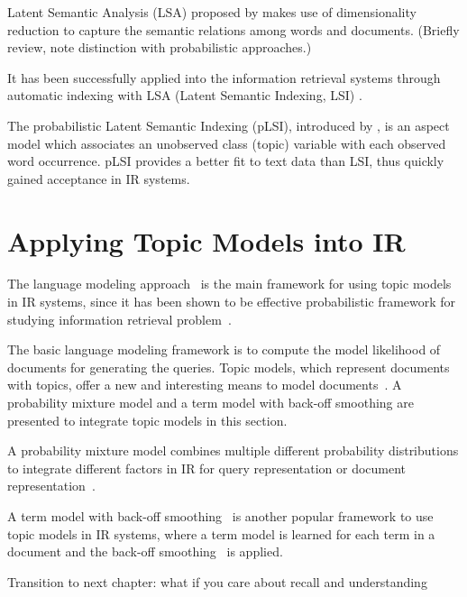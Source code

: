Latent Semantic Analysis (LSA) proposed by \citet{deerwester-90} makes use of dimensionality reduction to capture the semantic relations among words and documents.  (Briefly review, note distinction with probabilistic approaches.)

It has been successfully applied into the information retrieval systems through automatic indexing with LSA (Latent Semantic Indexing, LSI) \citep{deerwester-90,dumais-95}.

The probabilistic Latent Semantic Indexing (pLSI), introduced by \citet{hofmann-99a}, is an aspect model which associates an unobserved class (topic) variable with each observed word occurrence. pLSI provides a better fit to text data than LSI, thus quickly gained acceptance in IR systems.

\section{Applying Topic Models into IR}

The language modeling approach~\citep{croft-03,PonteCroft,song-99} is the main framework for using topic models in IR systems, since it has been shown to be effective probabilistic framework for studying information retrieval problem~\citep{PonteCroft,berger-99}.

The basic language modeling framework is to compute the model likelihood of documents for generating the queries. Topic models, which represent documents with topics, offer a new and interesting means to model documents~\citep{wei-07}. A probability mixture model and a term model with back-off smoothing are presented to integrate topic models in this section.

A probability mixture model combines multiple different probability distributions to integrate different factors in IR for query representation or document representation~\citep{miller-99,zhai-01,liu-04}.

A term model with back-off smoothing~\citep{katz-87} is another popular framework to use topic models in IR systems, where a term model is learned for each term in a document and the back-off smoothing~\citep{katz-87} is applied.


Transition to next chapter: what if you care about recall and understanding